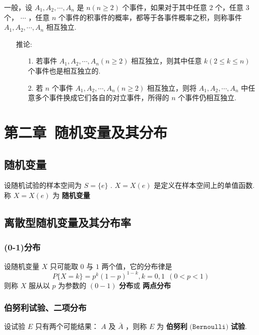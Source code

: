 \documentclass[UTF8,10pt]{ctexart}
\begin{document}
	一般，设 $ A_{1},A_{2}, \cdots ,A_{n} $ 是 $ n(n \ge 2) $ 个事件，如果对于其中任意 $ 2 $ 个，任意 $ 3 $ 个， $ \cdots $ ，任意 $ n $ 个事件的积事件的概率，都等于各事件概率之积，则称事件 $ A_{1},A_{2}, \cdots ,A_{n} $ 相互独立.
	
	\begin{itemize}
		\item [推论:] {
			\begin{enumerate}
				\item [1.] 若事件 $ A_{1},A_{2}, \cdots ,A_{n}(n \ge 2) $ 相互独立，则其中任意 $ k(2 \le k \le n) $ 个事件也是相互独立的.
				\item [2.] 若 $ n $ 个事件 $ A_{1},A_{2}, \cdots ,A_{n}(n \ge 2) $ 相互独立，则将 $ A_{1},A_{2}, \cdots ,A_{n} $ 中任意多个事件换成它们各自的对立事件，所得的 $ n $ 个事件仍相互独立.
			\end{enumerate}
		}
	\end{itemize}
	
	\section{第二章\ 随机变量及其分布}
	
	\subsection{随机变量}
	
	设随机试验的样本空间为 $ S=\{e\} $ . $ X=X(e) $ 是定义在样本空间上的单值函数.称 $ X=X(e) $ 为 \textbf{随机变量}
	
	\subsection{离散型随机变量及其分布率}
	
	\subsubsection{(0-1)分布}
	
	设随机变量 $ X $ 只可能取 $ 0 $ 与 $ 1 $ 两个值，它的分布律是 $$ P\{X=k\}=p^{k}(1-p)^{1-k},k=0,1\ \ (0<p<1) $$ 则称 $ X $ 服从以 $ p $ 为参数的 $ (0-1) $ \textbf{分布}或 \textbf{两点分布}
	
	\subsubsection{伯努利试验、二项分布}
	
	设试验 $ E $ 只有两个可能结果： $ A $ 及 $ \bar{A} $ ，则称 $ E $ 为 \textbf{伯努利} $ \texttt{(Bernoulli)} $ \textbf{试验}.
	
\end{document}
